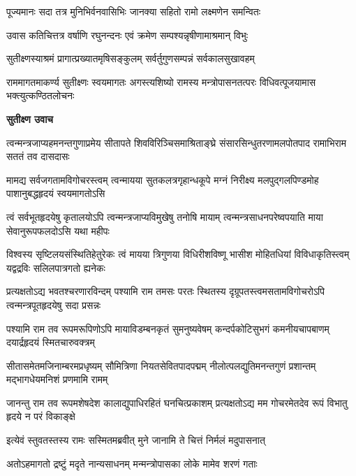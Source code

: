 \twolineshloka
{पूज्यमानः सदा तत्र मुनिभिर्वनवासिभिः}
{जानक्या सहितो रामो लक्ष्मणेन समन्वितः} %

\twolineshloka
{उवास कतिचित्तत्र वर्षाणि रघुनन्दनः}
{एवं क्रमेण सम्पश्यन्नृषीणामाश्रमान् विभुः} %

\twolineshloka
{सुतीक्ष्णस्याश्रमं प्रागात्प्रख्यातमृषिसङ्कुलम्}
{सर्वर्तुगुणसम्पन्नं सर्वकालसुखावहम्} %

\threelineshloka
{राममागतमाकर्ण्य सुतीक्ष्णः स्वयमागतः}
{अगस्त्यशिष्यो रामस्य मन्त्रोपासनतत्परः}
{विधिवत्पूजयामास भक्त्युत्कण्ठितलोचनः} %

\textbf{सुतीक्ष्ण उवाच}

\fourlineindentedshloka
{त्वन्मन्त्रजाप्यहमनन्तगुणाप्रमेय}
{सीतापते शिवविरिञ्चिसमाश्रिताङ्घ्रे}
{संसारसिन्धुतरणामलपोतपाद}
{रामाभिराम सततं तव दासदासः} %

\fourlineindentedshloka
{मामद्य सर्वजगतामविगोचरस्त्वम्}
{त्वन्मायया सुतकलत्रगृहान्धकूपे}
{मग्नं निरीक्ष्य मलपुद्गलपिण्डमोह\-}
{पाशानुबद्धहृदयं स्वयमागतोऽसि} %

\fourlineindentedshloka
{त्वं सर्वभूतहृदयेषु कृतालयोऽपि}
{त्वन्मन्त्रजाप्यविमुखेषु तनोषि मायाम्}
{त्वन्मन्त्रसाधनपरेष्वपयाति माया}
{सेवानुरूपफलदोऽसि यथा महीपः} %

\fourlineindentedshloka
{विश्वस्य सृष्टिलयसंस्थितिहेतुरेकः}
{त्वं मायया त्रिगुणया विधिरीशविष्णू}
{भासीश मोहितधियां विविधाकृतिस्त्वम्}
{यद्वद्रविः सलिलपात्रगतो ह्यनेकः} %

\fourlineindentedshloka
{प्रत्यक्षतोऽद्य भवतश्चरणारविन्दम्}
{पश्यामि राम तमसः परतः स्थितस्य}
{दृग्रूपतस्त्वमसतामविगोचरोऽपि}
{त्वन्मन्त्रपूतहृदयेषु सदा प्रसन्नः} %

\fourlineindentedshloka
{पश्यामि राम तव रूपमरूपिणोऽपि}
{मायाविडम्बनकृतं सुमनुष्यवेषम्}
{कन्दर्पकोटिसुभगं कमनीयचापबाणम्}
{दयार्द्रहृदयं स्मितचारुवक्त्रम्} %

\fourlineindentedshloka
{सीतासमेतमजिनाम्बरमप्रधृष्यम्}
{सौमित्रिणा नियतसेवितपादपद्मम्}
{नीलोत्पलद्युतिमनन्तगुणं प्रशान्तम्}
{मद्भागधेयमनिशं प्रणमामि रामम्} %

\fourlineindentedshloka
{जानन्तु राम तव रूपमशेषदेश\-}
{कालाद्युपाधिरहितं घनचित्प्रकाशम्}
{प्रत्यक्षतोऽद्य मम गोचरमेतदेव}
{रूपं विभातु हृदये न परं विकाङ्क्षे} %

\twolineshloka
{इत्येवं स्तुवतस्तस्य रामः सस्मितमब्रवीत्}
{मुने जानामि ते चित्तं निर्मलं मदुपासनात्} %

\twolineshloka
{अतोऽहमागतो द्रष्टुं मदृते नान्यसाधनम्}
{मन्मन्त्रोपासका लोके मामेव शरणं गताः} %

